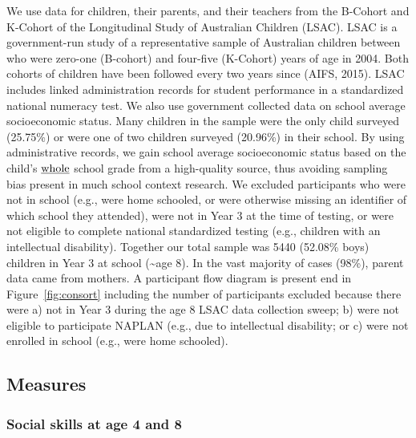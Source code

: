 \documentclass[
  english,
  man]{apa6}
\begin{document}
We use data for children, their parents, and their teachers from the B-Cohort and K-Cohort of the Longitudinal Study of Australian Children (LSAC). LSAC is a government-run study of a representative sample of Australian children between who were zero-one (B-cohort) and four-five (K-Cohort) years of age in 2004. Both cohorts of children have been followed every two years since (AIFS, 2015). LSAC includes linked administration records for student performance in a standardized national numeracy test. We also use government collected data on school average socioeconomic status. Many children in the sample were the only child surveyed (25.75\%) or were one of two children surveyed (20.96\%) in their school. By using administrative records, we gain school average socioeconomic status based on the child's \(\text{\underline{whole}}\) school grade from a high-quality source, thus avoiding sampling bias present in much school context research. We excluded participants who were not in school (e.g., were home schooled, or were otherwise missing an identifier of which school they attended), were not in Year 3 at the time of testing, or were not eligible to complete national standardized testing (e.g., children with an intellectual disability). Together our total sample was 5440 (52.08\% boys) children in Year 3 at school (\textasciitilde age 8). In the vast majority of cases (98\%), parent data came from mothers. A participant flow diagram is present end in Figure~\ref{fig:consort} including the number of participants excluded because there were a) not in Year 3 during the age 8 LSAC data collection sweep; b) were not eligible to participate NAPLAN (e.g., due to intellectual disability; or c) were not enrolled in school (e.g., were home schooled).

\hypertarget{measures}{%
\subsection{Measures}\label{measures}}

\hypertarget{social-skills-at-age-4-and-8}{%
\subsubsection{Social skills at age 4 and 8}\label{social-skills-at-age-4-and-8}}
\end{document}
